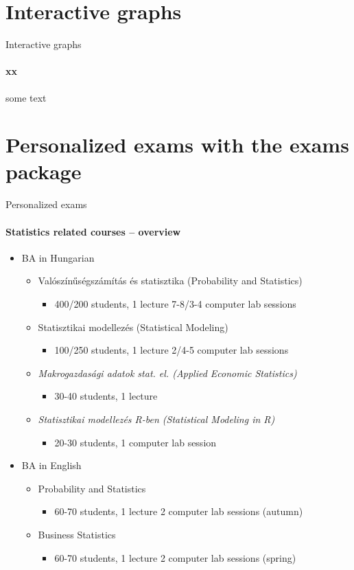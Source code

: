 \documentclass[10pt]{beamer}
\begin{document}
\section{Interactive graphs}

\begin{frame}{Interactive graphs}
\framesubtitle{xx}
some text
\end{frame}


\section{Personalized exams with the exams package}

\begin{frame}[allowframebreaks]{Personalized exams}
\framesubtitle{Statistics related courses -- overview}
\begin{itemize}
\item BA in Hungarian
\begin{itemize}
\item Valószínűségszámítás és statisztika (Probability and Statistics)
\begin{itemize}
\item 400/200 students, 1 lecture 7-8/3-4 computer lab sessions
\end{itemize}
\item Statisztikai modellezés (Statistical Modeling)
\begin{itemize}
\item 100/250 students, 1 lecture 2/4-5 computer lab sessions
\end{itemize}
\item \textit{Makrogazdasági adatok stat. el. (Applied Economic Statistics)}
\begin{itemize}
\item 30-40 students, 1 lecture
\end{itemize}
\item \textit{Statisztikai modellezés R-ben (Statistical Modeling in R)}
\begin{itemize}
\item 20-30 students, 1 computer lab session
\end{itemize}
\end{itemize}
\item BA in English
\begin{itemize}
\item Probability and Statistics
\begin{itemize}
\item 60-70 students, 1 lecture 2 computer lab sessions (autumn)
\end{itemize}
\item Business Statistics
\begin{itemize}
\item 60-70 students, 1 lecture 2 computer lab sessions (spring)
\end{itemize}
\end{itemize}
\end{itemize}
\end{frame}
\end{document}
